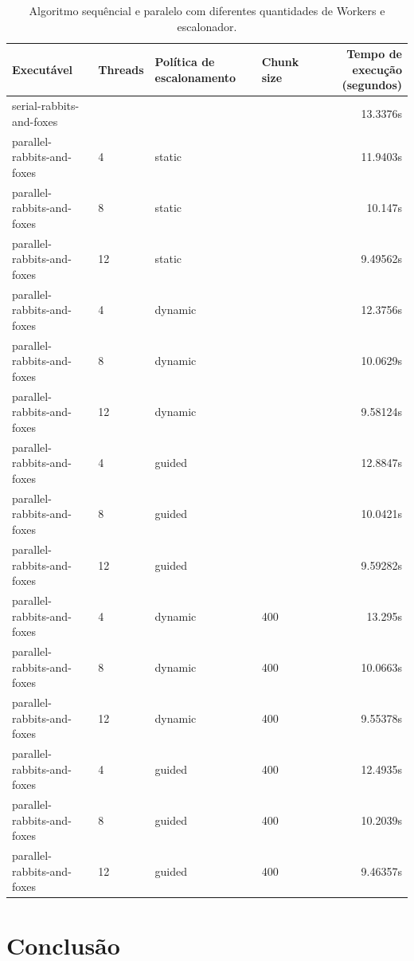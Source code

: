 \documentclass{article}
\begin{document}
\begin{table}[H]
	\tiny
	\begin{center}
\begin{tabular}{|l|l|l|l|r|}
\hline
 Executável   & Threads   & Política de escalonamento      & Chunk size    & Tempo de execução (segundos)  \\
 \hline\hline
 serial-rabbits-and-foxes   &    &       &     & 13.3376s  \\
 \hline
 parallel-rabbits-and-foxes & 4  & static &     & 11.9403s  \\
 parallel-rabbits-and-foxes & 8  & static &     & 10.147s   \\
 parallel-rabbits-and-foxes & 12 & static &     &  9.49562s \\\hline
 parallel-rabbits-and-foxes & 4  & dynamic&     & 12.3756s  \\
 parallel-rabbits-and-foxes & 8  & dynamic&     & 10.0629s  \\
 parallel-rabbits-and-foxes & 12 & dynamic&     &  9.58124s \\\hline
 parallel-rabbits-and-foxes & 4  & guided &     & 12.8847s  \\
 parallel-rabbits-and-foxes & 8  & guided &     & 10.0421s  \\
 parallel-rabbits-and-foxes & 12 & guided &     &  9.59282s \\
 \hline
 parallel-rabbits-and-foxes & 4  & dynamic& 400 & 13.295s   \\
 parallel-rabbits-and-foxes & 8  & dynamic& 400 & 10.0663s  \\
 parallel-rabbits-and-foxes & 12 & dynamic& 400 &  9.55378s \\\hline
 parallel-rabbits-and-foxes & 4  & guided&400  & 12.4935s  \\
 parallel-rabbits-and-foxes & 8  & guided&400  & 10.2039s  \\
 parallel-rabbits-and-foxes & 12 & guided&400  &  9.46357s \\
\hline
\end{tabular}
\end{center}

	\caption{Algoritmo sequêncial e paralelo com diferentes quantidades de Workers e escalonador.}
	\label{tab:resultados}
\end{table}


\section{Conclusão}
\end{document}
